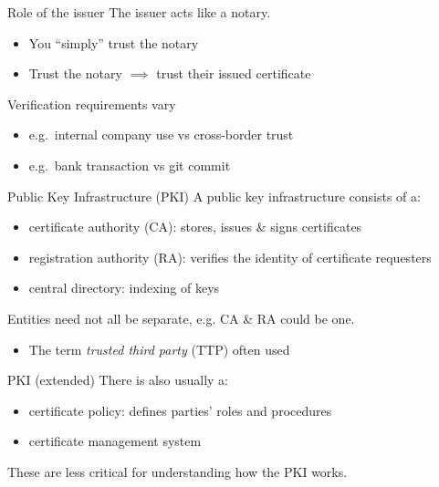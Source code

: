 \begin{frame}{Role of the issuer}
  The issuer acts like a notary.
  \begin{itemize}[<+(1)->]
    \item You \enquote{simply} trust the notary
    \item Trust the notary $\implies$ trust their issued certificate
  \end{itemize}

  \vspace*{1em}

  \pause
  Verification requirements vary
  \begin{itemize}[<+(1)->]
    \item e.g.\ internal company use vs cross-border trust
    \item e.g.\ bank transaction vs git commit
  \end{itemize}
\end{frame}

\begin{frame}{Public Key Infrastructure (PKI)}
  A public key infrastructure consists of a:
  \begin{itemize}[<+(1)->]
    \item certificate authority (CA): stores, issues \& signs certificates
    \item registration authority (RA): verifies the identity of certificate requesters
    \item central directory: indexing of keys
  \end{itemize}

  \vspace*{1em}

  \pause
  Entities need not all be separate, e.g. CA \& RA could be one.
  \begin{itemize}
    \item The term \emph{trusted third party} (TTP) often used
  \end{itemize}
\end{frame}

\begin{frame}{PKI (extended)}
  \pause
  There is also usually a:
  \begin{itemize}[<+(1)->]
    \item certificate policy: defines parties' roles and procedures
    \item certificate management system
  \end{itemize}

  \pause
  These are less critical for understanding how the PKI works.
\end{frame}

